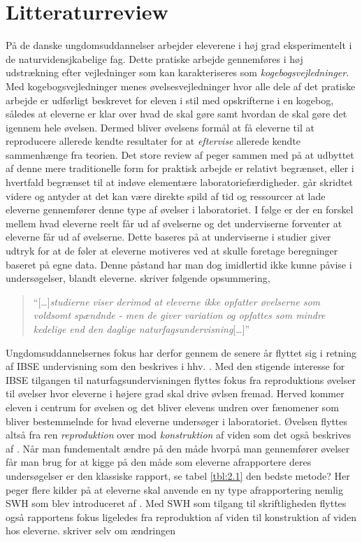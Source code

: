 \section{Litteraturreview}
\label{sec:2.3}

På de danske ungdomsuddannelser arbejder eleverene i høj grad eksperimentelt i de naturvidensjkabelige fag. Dette pratiske arbejde gennemføres i høj udstrækning efter vejledninger som kan karakteriseres som \emph{kogebogsvejledninger}. Med kogebogsvejledninger menes øvelsesvejledninger hvor alle dele af det pratiske arbejde er udførligt beskrevet for eleven i stil med opskrifterne i en kogebog, således at eleverne er klar over hvad de skal gøre samt hvordan de skal gøre det igennem hele øvelsen. Dermed bliver øvelsens formål at få eleverne til at reproducere allerede kendte resultater for at \emph{eftervise} allerede kendte sammenhænge fra teorien. Det store review af \citep{Miller2018} peger sammen med \citep{Hodson2008} på at udbyttet af denne mere traditionelle form for praktisk arbejde er relativt begrænset, eller i hvertfald begrænset til at indøve elementære laboratoriefærdigheder. \citep{Hodson2008} går skridtet videre og antyder at det kan være direkte spild af tid og ressourcer at lade eleverne gennemfører denne type af øvelser i laboratoriet.  I følge \citep{Hodson2008} er der en forskel mellem hvad eleverne reelt får ud af øvelserne  og det underviserne forventer at eleverne får ud af øvelserne. Dette baseres på at underviserne i studier giver udtryk for at de føler at eleverne motiveres ved at skulle foretage beregninger baseret på egne data. Denne påstand har man dog imidlertid ikke kunne påvise i undersøgelser, blandt eleverne. \citet{Krogh2016} skriver følgende opsummering,
\begin{quote}
``[\ldots]\emph{studierne viser derimod at eleverne ikke opfatter øvelserne som voldsomt spændnde - men de giver variation og opfattes som mindre kedelige end den daglige naturfagsundervisning}[\ldots]''
\end{quote}
Ungdomsuddannelsernes fokus har derfor gennem de senere år flyttet sig i retning af IBSE undervisning som den beskrives i hhv. \citep{Dolin2014, Krogh2016}. Med den stigende interesse for IBSE tilgangen til naturfagsundervisningen flyttes fokus fra reproduktions øvelser til øvelser hvor eleverne i højere grad skal drive øvlsen fremad. Herved kommer eleven i centrum for øvelsen og det bliver elevens undren over fænomener som bliver bestemmelnde for hvad eleverne undersøger i laboratoriet. Øvelsen flyttes altså fra ren \emph{reproduktion} over mod \emph{konstruktion} af viden som det også beskrives af \citep{Krogh2016}. Når man fundementalt ændre på den måde hvorpå man gennemfører øvelser får man brug for at kigge på den måde som eleverne afrapportere deres undersøgelser er den klassiske rapport, se tabel \vref{tbl:2.1} den bedste metode?  Her peger flere kilder \citep[m.fl.]{Burke2005, Erkol2010} på at eleverne skal anvende en ny type afrapportering nemlig SWH som blev introduceret af \citep{Keys1999}. Med SWH som tilgang til skriftligheden flyttes også rapportens fokus ligeledes fra reproduktion af viden til konstruktion af viden hos eleverne. \citet{Keys1999} skriver selv om ændringen 
